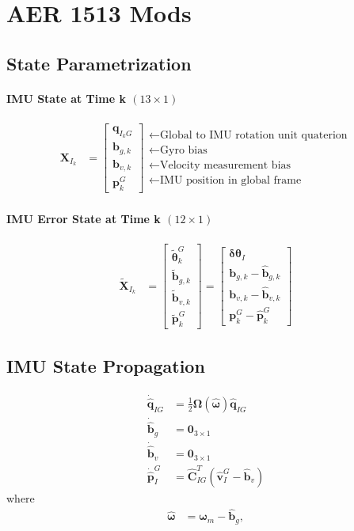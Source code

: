 \documentclass[10pt,letterpaper,fleqn,oneside]{article}
\newcommand{\nl}{\\[0.5em]}
\def\Vec#1{\mathbf{#1}} %
\newcommand{\bbm}{\begin{bmatrix}}
\newcommand{\ebm}{\end{bmatrix}}
\begin{document}
\section{AER 1513 Mods}

\subsection{State Parametrization}
\paragraph{IMU State at Time k $(13\times1)$}
\begin{align}
\Vec{X}_{I_k} &= \bbm \Vec{q}_{I_k G} \nl
								\Vec{b}_{g,k} \nl
								\Vec{b}_{v,k} \nl
								\Vec{p}^G_k 
						 \ebm 
						 \begin{array}{l}
						 \leftarrow \text{Global to IMU rotation unit quaterion} \nl
						 \leftarrow \text{Gyro bias} \nl
						 \leftarrow \text{Velocity measurement bias} \nl
						 \leftarrow \text{IMU position in global frame} 
						 \end{array}						 
\end{align}

\paragraph{IMU Error State at Time k $(12\times1)$}
\begin{align}
\widetilde{\Vec{X}}_{I_k} &= 	\bbm \widetilde{\boldsymbol{\theta}}^G_k \nl
										\widetilde{\Vec{b}}_{g,k} \nl
										\widetilde{\Vec{b}}_{v,k} \nl
										\widetilde{\Vec{p}}^G_k
								\ebm
								=
								\bbm
										\boldsymbol{\delta\theta}_I \nl
										\Vec{b}_{g,k} - \hat{\Vec{b}}_{g,k} \nl
										\Vec{b}_{v,k} - \hat{\Vec{b}}_{v,k} \nl
										\Vec{p}^G_k - \hat{\Vec{p}}^G_k 
								\ebm
\end{align}

\subsection{IMU State Propagation}
\begin{align}
\dot{\hat{\Vec{q}}}_{I G} &= \frac{1}{2}\boldsymbol{\Omega}\left(\hat{\boldsymbol{\omega}} \right)\hat{\Vec{q}}_{I G} \nl
\dot{\hat{\Vec{b}}}_g  &= \Vec{0}_{3\times1} \nl
\dot{\hat{\Vec{b}}}_v &= \Vec{0}_{3\times1} \nl
\dot{\hat{\Vec{p}}}^G_I &= \hat{\Vec{C}}_{I G}^T\left(\hat{\Vec{v}}^G_I - \hat{\Vec{b}}_v \right)
\end{align}
where
\begin{align}
\hat{\boldsymbol{\omega}} &= \boldsymbol{\omega}_m - \hat{\Vec{b}}_g,
\end{align}
\end{document}

